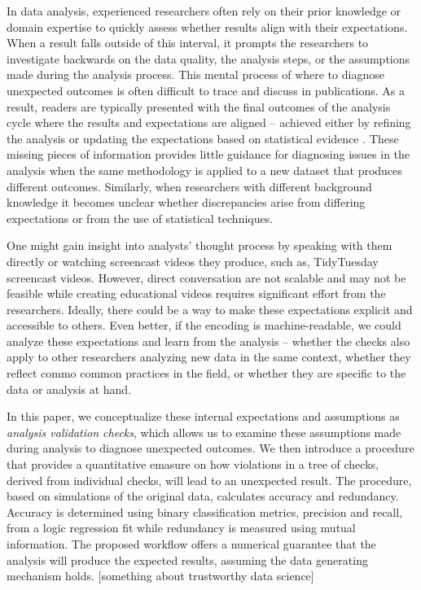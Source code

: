 \documentclass[
  12pt,
]{interact}
\begin{document}
In data analysis, experienced researchers often rely on their prior
knowledge or domain expertise to quickly assess whether results align
with their expectations. When a result falls outside of this interval,
it prompts the researchers to investigate backwards on the data quality,
the analysis steps, or the assumptions made during the analysis process.
This mental process of where to diagnose unexpected outcomes is often
difficult to trace and discuss in publications. As a result, readers are
typically presented with the final outcomes of the analysis cycle where
the results and expectations are aligned -- achieved either by refining
the analysis or updating the expectations based on statistical evidence
\citep{grolemund_cognitive_2014}. These missing pieces of information
provides little guidance for diagnosing issues in the analysis when the
same methodology is applied to a new dataset that produces different
outcomes. Similarly, when researchers with different background
knowledge it becomes unclear whether discrepancies arise from differing
expectations or from the use of statistical techniques.

One might gain insight into analysts' thought process by speaking with
them directly or watching screencast videos they produce, such as,
TidyTuesday screencast videos. However, direct conversation are not
scalable and may not be feasible while creating educational videos
requires significant effort from the researchers. Ideally, there could
be a way to make these expectations explicit and accessible to others.
Even better, if the encoding is machine-readable, we could analyze these
expectations and learn from the analysis -- whether the checks also
apply to other researchers analyzing new data in the same context,
whether they reflect commo common practices in the field, or whether
they are specific to the data or analysis at hand.

In this paper, we conceptualize these internal expectations and
assumptions as \emph{analysis validation checks}, which allows us to
examine these assumptions made during analysis to diagnose unexpected
outcomes. We then introduce a procedure that provides a quantitative
emasure on how violations in a tree of checks, derived from individual
checks, will lead to an unexpected result. The procedure, based on
simulations of the original data, calculates accuracy and redundancy.
Accuracy is determined using binary classification metrics, precision
and recall, from a logic regression fit while redundancy is measured
using mutual information. The proposed workflow offers a numerical
guarantee that the analysis will produce the expected results, assuming
the data generating mechanism holds. {[}something about trustworthy data
science{]}
\end{document}
